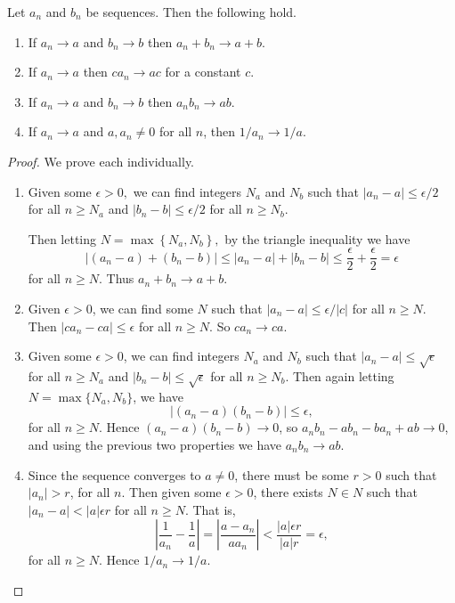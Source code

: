 \documentclass[a4paper]{scrartcl}
\begin{document}
\begin{proposition}
	\label{prop:manipulating}
	Let $a_n$ and $b_n$ be sequences. Then the following hold.
	\begin{enumerate}[label=(\roman*)]
		\item If $a_n \rightarrow a$ and $b_n \rightarrow b$ then $a_n + b_n \rightarrow a + b$.
		\item If $a_n \rightarrow a$ then $c a_n \rightarrow ac$ for a constant $c$.
		\item If $a_n \rightarrow a$ and $b_n \rightarrow b$ then $a_n b_n \rightarrow a b$.
		\item If $a_n \rightarrow a$ and $a, a_n \neq 0$ for all $n$, then $1/a_n \rightarrow 1/a$.
	\end{enumerate}
\end{proposition}
\begin{proof}
	We prove each individually.
	\begin{enumerate}[label=(\roman*)]
		\item Given some $\epsilon>0,$ we can find integers $N_{a}$ and $N_{b}$ such that $|a_n - a| \leq \epsilon/2$ for all $n \geq N_a$ and $|b_n - b| \leq \epsilon/2$ for all $n \geq N_b$.
		
		Then letting $N=\max \left\{N_{a}, N_{b}\right\},$ by the triangle inequality we have
		$$
			\left|\left(a_{n}-a\right)+\left(b_{n}-b\right)\right| \leq\left|a_{n}-a\right|+\left|b_{n}-b\right|
			\leq \frac{\epsilon}{2}+\frac{\epsilon}{2}=\epsilon
		$$
		for all $n \geq N$. Thus $a_{n}+b_{n} \rightarrow a+b$.
		\item Given $\epsilon > 0$, we can find some $N$ such that
		$|a_n - a| \leq \epsilon/|c|$ for all $n \geq N$. Then $|ca_n - ca| \leq \epsilon$ for all $n \geq N$. So $c a_n \rightarrow c a$.
		\item Given some $\epsilon > 0$, we can find integers $N_a$ and $N_b$ such that $|a_n - a| \leq \sqrt{\epsilon}$ for all $n \geq N_a$ and $|b_n - b| \leq \sqrt{\epsilon}$ for all $n \geq N_b$. Then again letting $N = \max\{N_a, N_b\}$, we have
		$$
			|(a_n - a)(b_n - b)| \leq \epsilon,
		$$
		for all $n \geq N$.
		Hence $(a_n - a)(b_n - b) \rightarrow 0$, so $a_n b_n - a b_n - b a_n + ab \rightarrow 0$, and using the previous two properties we have $a_n b_n \rightarrow ab$.
		\item Since the sequence converges to $a \neq 0$, there must be some $r>0$ such that $|a_n|>r$, for all $n$.
		Then given some $\epsilon > 0$, there exists $N \in N$ such that $|a_n - a| < |a|\epsilon r$ for all $n \geq N$. That is,
		$$
		\left|\frac{1}{a_n} - \frac{1}{a}\right|=\left|\frac{a - a_n}{a a_n}\right| < \frac{|a|\epsilon r}{|a|r} = \epsilon,
		$$
		for all $n \geq N$.
		Hence $1/a_n \rightarrow 1/a$. \qedhere
	\end{enumerate}
\end{proof}
\end{document}
